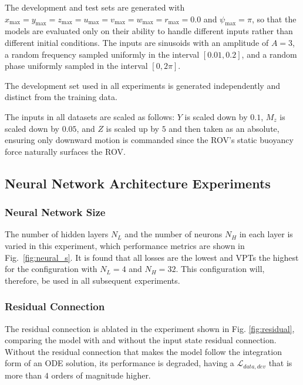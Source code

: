 The development and test sets are generated with $x_{\max} = y_{\max} = z_{\max} = u_{\max} = v_{\max} = w_{\max} = r_{\max} = 0.0$ and $\psi_{\max} = \pi$, so that the models are evaluated only on their ability to handle different inputs rather than different initial conditions. The inputs are sinusoids with an amplitude of $A=3$, a random frequency sampled uniformly in the interval $[0.01, 0.2]$, and a random phase uniformly sampled in the interval $[0, 2\pi]$.

\begin{remark} The development set used in all experiments is generated independently and distinct from the training data. \end{remark}


\begin{remark}
    The inputs in all datasets are scaled as follows: $Y$ is scaled down by $0.1$, $M_z$ is scaled down by $0.05$, and $Z$ is scaled up by $5$ and then taken as an absolute, ensuring only downward motion is commanded since the ROV's static buoyancy force naturally surfaces the ROV.
\end{remark}



\subsection{Neural Network Architecture Experiments}
\label{subsec:nn_arch}

\newcommand{\PlotHeight}{6cm}



\subsubsection{Neural Network Size}
The number of hidden layers $N_L$ and the number of neurons $N_H$ in each layer is varied in this experiment, which performance metrics are shown in Fig.~\ref{fig:neural_s}. It is found that all losses are the lowest and VPTs the highest for the configuration with $N_L = 4$ and $N_H = 32$. This configuration will, therefore, be used in all subsequent experiments.

\subsubsection{Residual Connection}
The residual connection is ablated in the experiment shown in Fig. \ref{fig:residual}, comparing the model with and without the input state residual connection. Without the residual connection that makes the model follow the integration form of an ODE solution, its performance is degraded, having a $\mathcal{L}_{data,dev}$ that is more than $4$ orders of magnitude higher. 
%

